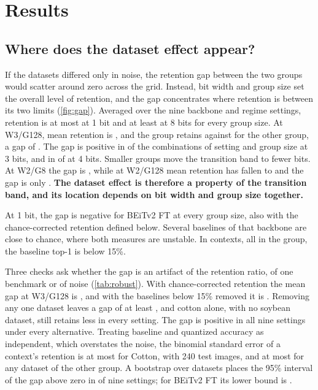 \section{Results}
\label{sec:results}

\subsection{Where does the dataset effect appear?}

If the datasets differed only in noise, the retention gap between the two groups would scatter around zero across the grid.
Instead, bit width and group size set the overall level of retention, and the gap concentrates where retention is between its two limits (\cref{fig:gap}).
Averaged over the nine backbone and regime settings, retention is at most  at 1 bit and at least  at 8 bits for every group size.
At W3/G128, mean retention is , and the \SC{} group retains  against  for the other group, a gap of .
The gap is positive in  of the  combinations of setting and group size at 3 bits, and in  of  at 4 bits.
Smaller groups move the transition band to fewer bits.
At W2/G8 the gap is , while at W2/G128 mean retention has fallen to  and the gap is only .
\textbf{The dataset effect is therefore a property of the transition band, and its location depends on bit width and group size together.}

At 1 bit, the gap is negative for BEiTv2 FT at every group size, also with the chance-corrected retention defined below.
Several \SC{} baselines of that backbone are close to chance, where both measures are unstable.
In  contexts, all in the \SC{} group, the baseline top-1 is below 15\%.

Three checks ask whether the gap is an artifact of the retention ratio, of one benchmark or of noise (\cref{tab:robust}).
With chance-corrected retention the mean gap at W3/G128 is , and with the baselines below 15\% removed it is .
Removing any one \SC{} dataset leaves a gap of at least , and cotton alone, with no soybean dataset, still retains less in every setting.
The gap is positive in all nine settings under every alternative.
Treating baseline and quantized accuracy as independent, which overstates the noise, the binomial standard error of a context's retention is at most  for Cotton, with 240 test images, and at most  for any dataset of the other group.
A bootstrap over datasets places the 95\% interval of the gap above zero in  of nine settings; for BEiTv2 FT its lower bound is .

